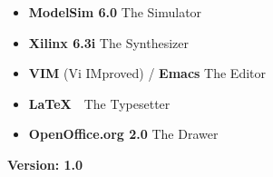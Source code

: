 \documentclass[a4paper,12pt]{report}
\begin{document}
\begin{itemize}
\item \textbf{ModelSim 6.0} The Simulator
\item \textbf{Xilinx 6.3i} The Synthesizer
\item \textbf{VIM} (Vi IMproved) / \textbf{Emacs} The Editor
\item \textbf{\LaTeX}~~The Typesetter
\item \textbf{OpenOffice.org 2.0} The Drawer
\end{itemize}

\vspace{1cm}
\begin{tabbing}
\textbf{Version: 1.0} 
\end{tabbing}
\end{document}
